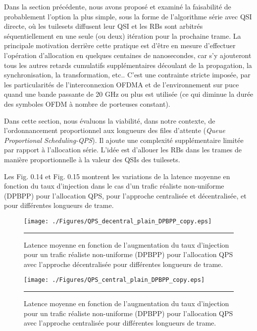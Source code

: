 Dans la section précédente, nous avons proposé et examiné la faisabilité de probablement l’option la plus simple, sous la forme de l’algorithme série avec QSI directe, où les tuilesets diffusent leur QSI et les RBs sont arbitrés séquentiellement en une seule (ou deux) itération pour la prochaine trame. La principale motivation derrière cette pratique est d'être en mesure d'effectuer l'opération d'allocation en quelques centaines de nanosecondes, car s’y ajouteront tous les autres retards cumulatifs supplémentaires découlant de la propagation, la synchronisation, la transformation, etc.. C’est une contrainte stricte imposée, par les particularités de l'interconnexion OFDMA et de l'environnement sur puce quand une bande passante de 20 GHz ou plus est utilisée (ce qui diminue la durée des symboles OFDM à nombre de porteuses constant).

Dans cette section, nous évaluons la viabilité, dans notre contexte, de l'ordonnancement proportionnel aux longueurs des files d'attente (\textit{Queue Proportional Scheduling-QPS}). Il ajoute une complexité supplémentaire limitée par rapport à l'allocation série. L’idée est d'allouer les RBs dans les trames de manière proportionnelle à la valeur des QSIs des tuilesets. 

Les Fig. 0.14 et Fig. 0.15 montrent les variations de la latence moyenne en fonction du taux d'injection dans le cas d’un trafic réaliste non-uniforme (DPBPP) pour l'allocation QPS, pour l'approche centralisée et décentralisée, et pour différentes longueurs de trame. 


\begin{figure}[htbp]
  \centering
    \texttt{[image: ./Figures/QPS\_decentral\_plain\_DPBPP\_copy.eps]}
    \rule{35em}{0.5pt}
  \caption[Latence moyenne en fonction de l'augmentation du taux d'injection pour un trafic réaliste non-uniforme (DPBPP) pour l'allocation QPS avec l'approche décentralisée pour différentes longueurs de trame.]{Latence moyenne en fonction de l'augmentation du taux d'injection pour un trafic réaliste non-uniforme (DPBPP) pour l'allocation QPS avec l'approche décentralisée pour différentes longueurs de trame.}
  \label{fig:Electron}
\end{figure}

\begin{figure}[htbp]
  \centering
    \texttt{[image: ./Figures/QPS\_central\_plain\_DPBPP\_copy.eps]}
    \rule{35em}{0.5pt}
  \caption[Latence moyenne en fonction de l'augmentation du taux d'injection pour un trafic réaliste non-uniforme (DPBPP) pour l'allocation QPS avec l'approche centralisée pour différentes longueurs de trame.]{Latence moyenne en fonction de l'augmentation du taux d'injection pour un trafic réaliste non-uniforme (DPBPP) pour l'allocation QPS avec l'approche centralisée pour différentes longueurs de trame.}
  \label{fig:Electron}
\end{figure}

